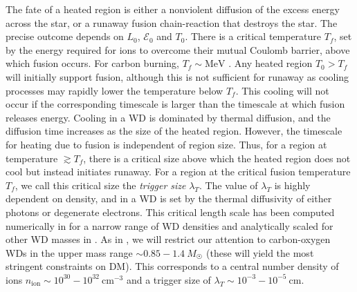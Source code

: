 \documentclass[twocolumn, preprintnumbers,amsmath,amssymb,prd, superscriptaddress]{revtex4}
\newcommand{\Ez}{\mathcal{E}_0}
\newcommand{\MeV}{\text{MeV}}
\newcommand{\cm}{\text{cm}}
\begin{document}
The fate of a heated region is either a nonviolent diffusion of the excess energy across the star, or a runaway fusion chain-reaction that destroys the star.
The precise outcome depends on $L_0$, $\Ez$ and $T_0$.
There is a critical temperature $T_f$, set by the energy required for ions to overcome their mutual Coulomb barrier, above which fusion occurs.
For carbon burning, $T_f \sim \MeV$ \cite{Gasques:2005ar}.
Any heated region $T_0 > T_f$ will initially support fusion, although this is not sufficient for runaway as cooling processes may rapidly lower the temperature below $T_f$.
This cooling will not occur if the corresponding timescale is larger than the timescale at which fusion releases energy.
Cooling in a WD is dominated by thermal diffusion, and the diffusion time increases as the size of the heated region.
However, the timescale for heating due to fusion is independent of region size.
Thus, for a region at temperature $\gtrsim T_f$, there is a critical size above which the heated region does not cool but instead initiates runaway.
For a region at the critical fusion temperature $T_f$, we call this critical size the \emph{trigger size} $\lambda_T$.
The value of $\lambda_T$ is highly dependent on density, and in a WD is set by the thermal diffusivity of either photons or degenerate electrons.
This critical length scale has been computed numerically in \cite{Woosley} for a narrow range of WD densities and analytically scaled for other WD masses in \cite{Graham:2015apa}.
As in \cite{Graham:2015apa}, we will restrict our attention to carbon-oxygen WDs in the upper mass range $\sim 0.85 - 1.4 ~M_{\astrosun}$ (these will yield the most stringent constraints on DM).
This corresponds to a central number density of ions $n_\text{ion} \sim 10^{30} - 10^{32} ~\cm^{-3}$ and a trigger size of $\lambda_T \sim 10^{-3} - 10^{-5} ~\text{cm}$.
\end{document}
